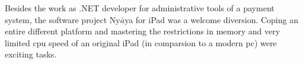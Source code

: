 

Besides the work as .NET developer for administrative tools of a payment system, 
the software project Ny$\bar{a}$ya for iPad was a welcome diversion.
Coping an entire different platform and mastering 
the restrictions in memory and very limited cpu speed of an original iPad 
(in comparsion to a modern pc) were exciting tasks. 


